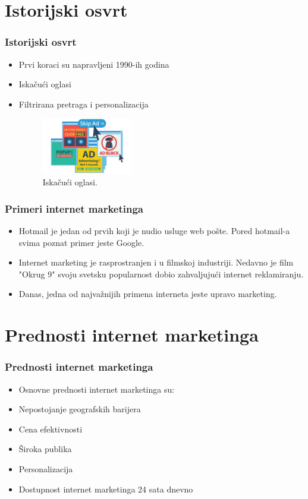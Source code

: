 \documentclass{beamer}
\begin{document}
\section{Istorijski osvrt}
\begin{frame}[fragile]\frametitle{Istorijski osvrt}
	\begin{itemize}
		\item Prvi koraci su napravljeni 1990-ih godina \\
		\item Iskačući oglasi
        \item Filtrirana pretraga i personalizacija
        \medskip
\begin{figure}[h!]
\begin{center}
\includegraphics[width=4cm]{iskacuci.oglasi.jpg}
\end{center}
\caption{Iskačući oglasi.}
\label{fig:oglasi}
\end{figure}
\end{itemize}
\end{frame}

\begin{frame}[fragile]\frametitle{Primeri internet marketinga}
	\begin{itemize}
		\item Hotmail je jedan od prvih koji je nudio usluge web pošte. Pored hotmail-a svima poznat primer jeste Google. 
		\item Internet marketing je rasprostranjen i u filmskoj industriji. Nedavno je film "Okrug 9" svoju svetsku popularnost dobio zahvaljujući internet reklamiranju.
        \item Danas, jedna od najvažnijih primena interneta jeste upravo marketing.
	\end{itemize}
\end{frame}

\section{Prednosti internet marketinga}
\begin{frame}[fragile]\frametitle{Prednosti internet marketinga}
	\begin{itemize}
	\item Osnovne prednosti internet marketinga su:
    \end{itemize}
    \begin{itemize}
      \item Nepostojanje geografskih barijera
     \item Cena efektivnosti
      \item Široka publika
       \item Personalizacija 
      \item Dostupnost internet marketinga 24 sata dnevno
	\end{itemize}
\end{frame}
\end{document}

